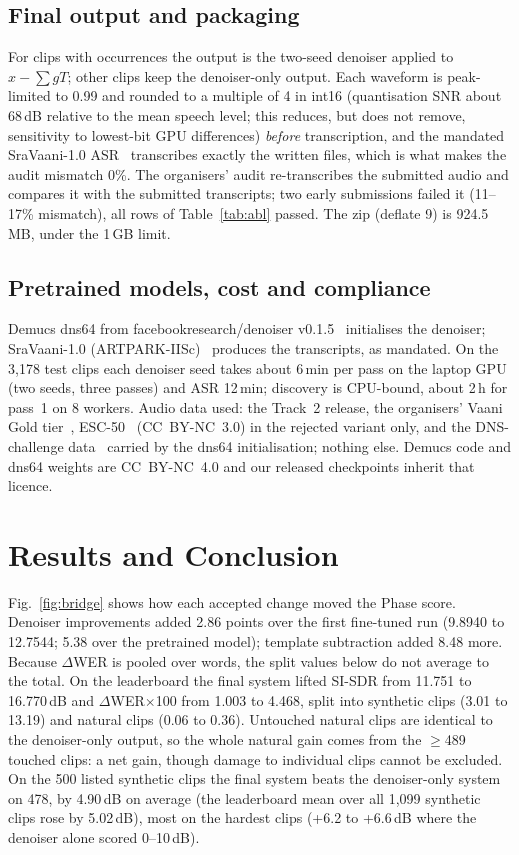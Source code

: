 \documentclass[conference]{IEEEtran}
\begin{document}
\subsection{Final output and packaging}
For clips with occurrences the output is the two-seed denoiser applied to $x-\sum gT$; other clips keep the
denoiser-only output. Each waveform is peak-limited to 0.99 and rounded to a multiple of 4 in int16 (quantisation SNR
about 68\,dB relative to the mean speech level; this reduces, but does not remove, sensitivity to lowest-bit GPU
differences) \emph{before} transcription, and the mandated SraVaani-1.0 ASR~\cite{sravaani} transcribes exactly the
written files, which is what makes the audit mismatch 0\%. The organisers' audit re-transcribes the submitted audio
and compares it with the submitted transcripts; two early submissions failed it (11--17\% mismatch), all rows of
Table~\ref{tab:abl} passed. The zip (deflate 9) is 924.5\,MB, under the 1\,GB limit.

\subsection{Pretrained models, cost and compliance}
Demucs dns64 from facebookresearch/denoiser v0.1.5~\cite{denoiserrepo} initialises the denoiser; SraVaani-1.0
(ARTPARK-IISc)~\cite{sravaani} produces the transcripts, as mandated. On the 3,178 test clips each denoiser seed
takes about 6\,min per pass on the laptop GPU (two seeds, three passes) and ASR 12\,min; discovery is CPU-bound,
about 2\,h for pass~1 on 8 workers. Audio data used: the Track~2 release, the organisers' Vaani Gold
tier~\cite{vaani}, ESC-50~\cite{esc50} (CC~BY-NC~3.0) in the rejected variant only, and the DNS-challenge
data~\cite{dns} carried by the dns64 initialisation; nothing else. Demucs code and dns64 weights are CC~BY-NC~4.0
and our released checkpoints inherit that licence.

\section{Results and Conclusion}\label{sec:res}
Fig.~\ref{fig:bridge} shows how each accepted change moved the Phase score. Denoiser improvements added
2.86 points over the first fine-tuned run (9.8940 to 12.7544; 5.38 over the pretrained model); template subtraction
added 8.48 more. Because $\Delta$WER is pooled over words, the split values below do not average to the total. On the leaderboard the final system lifted SI\nobreakdash-SDR from 11.751 to 16.770\,dB and
$\Delta$WER$\times$100 from 1.003 to 4.468, split into synthetic clips (3.01 to 13.19) and natural clips (0.06 to
0.36). Untouched natural clips are identical to the denoiser-only output, so the whole natural gain comes from the
$\geq$489 touched clips: a net gain, though damage to individual clips cannot be excluded. On the 500 listed synthetic
clips the final system beats the denoiser-only system on 478, by 4.90\,dB on average (the leaderboard mean over all
1,099 synthetic clips rose by 5.02\,dB), most on the hardest clips (+6.2 to +6.6\,dB where the denoiser alone scored
0--10\,dB).
\end{document}
